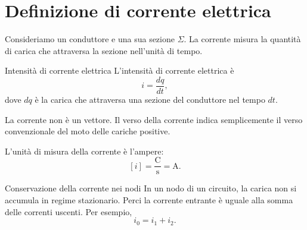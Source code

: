 \documentclass[a4paper]{article}
\begin{document}
\section{Definizione di corrente elettrica}

Consideriamo un conduttore e una sua sezione \(\Sigma\). La corrente misura la quantità di carica che attraversa la sezione nell'unità di tempo.

\begin{center}
\end{center}

\begin{snippetdefinition}{Intensità di corrente elettrica}
    L'intensità di corrente elettrica è
    \[
        i=\frac{dq}{dt},
    \]
    dove \(dq\) è la carica che attraversa una sezione del conduttore nel tempo \(dt\).
\end{snippetdefinition}

La corrente non è un vettore. Il verso della corrente indica semplicemente il verso convenzionale del moto delle cariche positive.

L'unità di misura della corrente è l'ampere:
\[
    [i]=\frac{\mathrm{C}}{\mathrm{s}}=\mathrm{A}.
\]

\begin{snippetproposition}{Conservazione della corrente nei nodi}
    In un nodo di un circuito, la carica non si accumula in regime stazionario. Perci la corrente entrante è uguale alla somma delle correnti uscenti. Per esempio,
    \[
        i_0=i_1+i_2.
    \]
\end{snippetproposition}

\begin{center}
\end{center}
\end{document}
